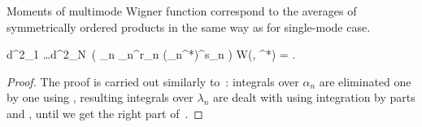 Moments of multimode Wigner function correspond to the averages of symmetrically ordered products in the same way as for single-mode case.

\begin{theorem}
	\begin{eqn*}
		\int d^2\alpha_1 \ldots \int d^2\alpha_N\,
			\left(
				\prod_n \alpha_n^{r_n} (\alpha_n^*)^{s_n}
			\right) W(\balpha, \balpha^*)
		= \langle {} \rangle.
	\end{eqn*}
\end{theorem}
\begin{proof}
The proof is carried out similarly to~: integrals over $\alpha_n$ are eliminated one by one using , resulting integrals over $\lambda_n$ are dealt with using integration by parts and , until we get the right part of~.
\end{proof}
